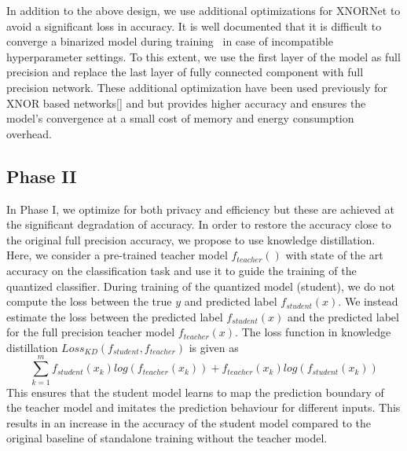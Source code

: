 In addition to the above design, we use additional optimizations for XNORNet to avoid a significant loss in accuracy.
It is well documented that it is difficult to converge a binarized model during training~\cite{AAAI1714619} in case of incompatible hyperparameter settings.
To this extent, we use the first layer of the model as full precision and replace the last layer of fully connected component with full precision network.
These additional optimization have been used previously for XNOR based networks[] and but provides higher accuracy and ensures the model's convergence at a small cost of memory and energy consumption overhead.



\subsection{Phase II}

In Phase I, we optimize for both privacy and efficiency but these are achieved at the significant degradation of accuracy.
In order to restore the accuracy close to the original full precision accuracy, we propose to use knowledge distillation.
Here, we consider a pre-trained teacher model $f_{teacher}()$ with state of the art accuracy on the classification task and use it to guide the training of the quantized classifier.
During training of the quantized model (student), we do not compute the loss between the true $y$ and predicted label $f_{student}(x)$.
We instead estimate the loss between the predicted label $f_{student}(x)$ and the predicted label for the full precision teacher model $f_{teacher}(x)$.
The loss function in knowledge distillation $Loss_{KD} (f_{student}, f_{teacher})$ is given as
\begin{equation}
\sum_{k=1}^m f_{student}(x_k)log(f_{teacher}(x_k)) + f_{teacher}(x_k)log(f_{student}(x_k))
\end{equation}
%
This ensures that the student model learns to map the prediction boundary of the teacher model and imitates the prediction behaviour for different inputs.
This results in an increase in the accuracy of the student model compared to the original baseline of standalone training without the teacher model.
